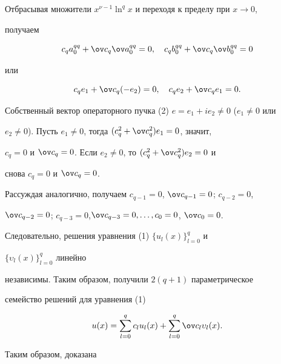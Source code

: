Отбрасывая множители $x^{\nu-1}\ln^q x$ и переходя к пределу при $x\to0$, 


получаем 


$$ 


c_q a^{qq}_0+\ov c_q \ov a^{qq}_0=0,\quad 


c_q b^{qq}_0+\ov c_q \ov b^{qq}_0=0 


$$ 


или 


$$ 


c_q e_1+\ov c_q(-e_2)=0,\quad c_q e_2+\ov c_q e_1=0. 


$$ 


 


Собственный вектор операторного пучка (2) $e=e_1+ie_2\ne0$ ($e_1\ne0$ или 


$e_2\ne0$). Пусть $e_1\ne0$, тогда $(c^2_q+\ov c^2_q)e_1=0$, значит, 


$c_q=0$ и $\ov c_q=0$. Если $e_2\ne0$, то $(c^2_q+\ov c^2_q)e_2=0$ и 


снова $c_q=0$ и $\ov c_q=0$. 


 


Рассуждая аналогично, получаем $c_{q-1}=0$, $\ov c_{q-1}=0$; $c_{q-2}=0$, 


$\ov c_{q-2}=0$; $c_{q-3}=0$,\linebreak $\ov c_{q-3}=0,\dotsc,c_0=0$, $\ov 


c_0=0$. 


 


Следовательно, решения уравнения (1) $\{u_l(x)\}^q_{l=0}$ и 


$\{\upsilon_l(x)\}^q_{l=0}$ линейно 


независимы. Таким образом, получили $2(q+1)$ параметрическое 


семейство решений для уравнения (1) 


$$ 


u(x)=\sum^q_{l=0}c_l u_l(x)+\sum^q_{l=0} 


\ov c_l\upsilon_l(x). 


$$ 


 


Таким образом, доказана 


 


